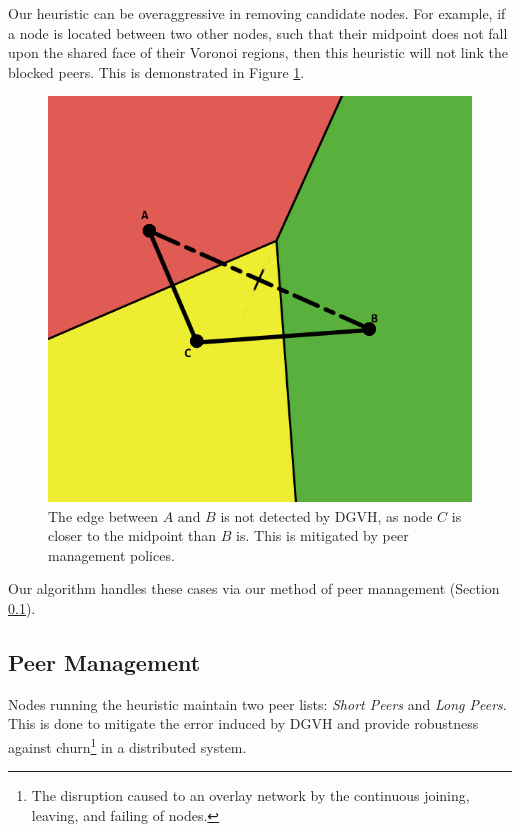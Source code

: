 Our heuristic can be overaggressive in removing candidate nodes.
For example, if a node is located between two other nodes, such that their midpoint does not fall upon the shared face of their Voronoi regions, then this heuristic will not link the blocked peers.
This is demonstrated in Figure \ref{occ-ex}.
\begin{figure}
	\centering
	\includegraphics[width=\linewidth]{occlusion}
	\caption{The edge between $A$ and $B$ is not detected by DGVH, as node $C$ is closer to the midpoint than $B$ is.  This is mitigated by peer management polices.}  %
	\label{occ-ex}
\end{figure}
Our algorithm handles these cases via our method of peer management (Section \ref{sec:manage}).






\subsection{Peer Management}
\label{sec:manage}
Nodes running the heuristic maintain two peer lists: \textit{Short Peers} and \textit{Long Peers}.
This is done to mitigate the error induced by DGVH and provide robustness against churn\footnote{The disruption caused to an overlay network by the continuous joining, leaving, and failing of nodes.} in a distributed system.

